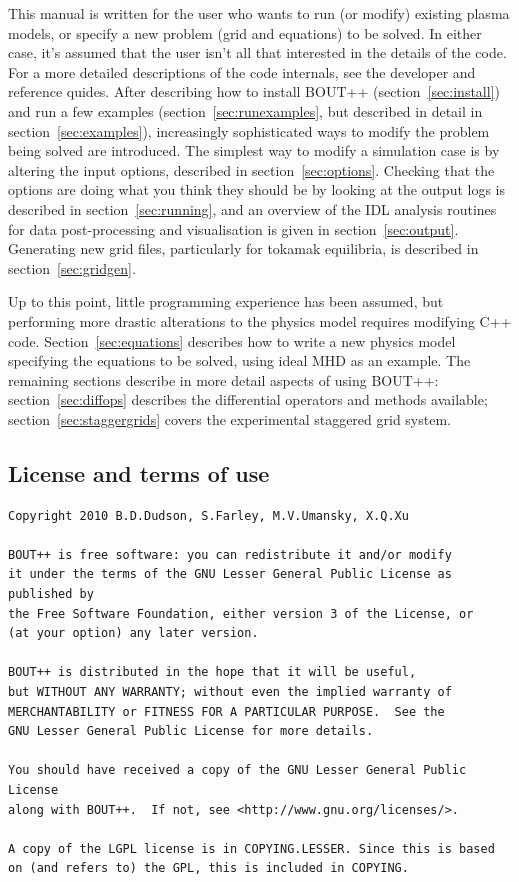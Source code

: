 \documentclass[12pt]{article}
\begin{document}
This manual is written for the user who wants to run (or modify) existing plasma models, or 
specify a new problem (grid and equations) to be solved. In either case, it's assumed that
the user isn't all that interested in the details of the code.
For a more detailed descriptions of the code internals, see the developer
and reference quides.
After describing how to install BOUT++ (section~\ref{sec:install}) and run a few examples 
(section~\ref{sec:runexamples}, but described in detail in section~\ref{sec:examples}), increasingly sophisticated ways to modify the problem being solved are introduced.
The simplest way to modify a simulation case is by altering the input options, described in
section~\ref{sec:options}. Checking that the options are doing what you think they should be
by looking at the output logs is described in section~\ref{sec:running}, and an overview of the IDL analysis routines
for data post-processing and visualisation is given in section~\ref{sec:output}.
Generating new grid files, particularly for tokamak equilibria, is described in section~\ref{sec:gridgen}.

Up to this point, little programming experience has been assumed, but performing more drastic
alterations to the physics model requires modifying C++ code.
Section~\ref{sec:equations} describes how to write a new physics model specifying the equations to be solved,
using ideal MHD as an example. The remaining sections describe in more detail aspects of using BOUT++:
section~\ref{sec:diffops} describes the differential operators and methods available; section~\ref{sec:staggergrids}
covers the experimental staggered grid system.

\subsection{License and terms of use}

\begin{verbatim}
Copyright 2010 B.D.Dudson, S.Farley, M.V.Umansky, X.Q.Xu

BOUT++ is free software: you can redistribute it and/or modify
it under the terms of the GNU Lesser General Public License as published by
the Free Software Foundation, either version 3 of the License, or
(at your option) any later version.

BOUT++ is distributed in the hope that it will be useful,
but WITHOUT ANY WARRANTY; without even the implied warranty of
MERCHANTABILITY or FITNESS FOR A PARTICULAR PURPOSE.  See the
GNU Lesser General Public License for more details.

You should have received a copy of the GNU Lesser General Public License
along with BOUT++.  If not, see <http://www.gnu.org/licenses/>.

A copy of the LGPL license is in COPYING.LESSER. Since this is based
on (and refers to) the GPL, this is included in COPYING.
\end{verbatim}
\end{document}
